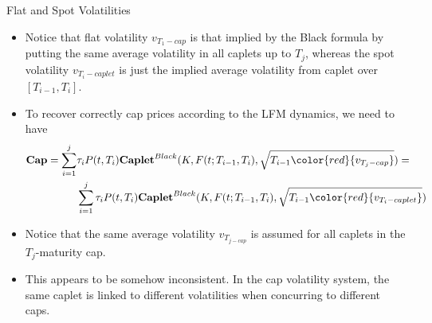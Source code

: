 \documentclass{beamer}
\begin{document}
\begin{frame}{Flat and Spot Volatilities}
	\begin{itemize}
		\item<1-> Notice that flat volatility $v_{T_1-cap}$ is that implied by the Black formula by putting the same average volatility in all caplets up to $T_j$, whereas the spot volatility $v_{T_i-caplet}$ is just the implied average volatility from caplet over $[T_{i-1}, T_i]$.
		\item<2-> To recover correctly cap prices according to the LFM dynamics, we need to have
		\begin{equation*}
			\begin{aligned}
				\textbf{Cap} = \sum_{i=1}^j&\tau_iP(t,T_i)\textbf{Caplet}^{Black}(K,F(t;T_{i-1},T_i),\sqrt{T_{i-1}\color{red}{v_{T_j-cap}}}) = \\ &\sum_{i=1}^j\tau_iP(t,T_i)\textbf{Caplet}^{Black}(K,F(t;T_{i-1},T_i),\sqrt{T_{i-1}\color{red}{v_{T_i-caplet}}})\\
			\end{aligned}
		\label{eq:spot_flat_vola}
		\end{equation*}
		\item<3-> Notice that the same average volatility $v_{T_{j-cap}}$ is assumed for all caplets in the $T_j$-maturity cap. 
		\item<4-> This appears to be somehow inconsistent. In the cap volatility system, the same caplet is linked to different volatilities when concurring to different caps.	
	\end{itemize}
\end{frame}	

\end{document}

